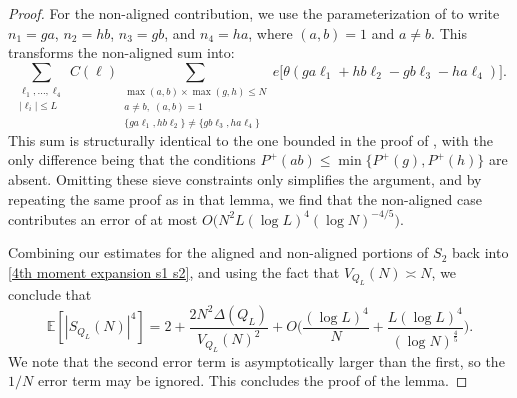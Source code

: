 \documentclass[12pt]{amsart}
\renewcommand{\leq}{\leqslant}
\numberwithin{equation}{section}
\theoremstyle{plain}
\theoremstyle{definition}
\renewcommand{\l}{\ell}
\newcommand{\E}{\mathbb{E}}
\begin{document}
\begin{proof}
		For the non-aligned contribution, we use the parameterization of  to write $n_1 = ga$, $n_2 = hb$, $n_3 = gb$, and $n_4 = ha$, where $(a,b)=1$ and $a \ne b$. This transforms the non-aligned sum into:
		\begin{equation}\label{eq: non-aligned T3 sum}
			\sum_{\substack{\l_1,\dots,\l_4 \\ |\l_i| \leq L}} C(\bm{\l}) \sum_{\substack{\max(a,b) \times \max(g,h) \leq N \\ a \ne b, \; (a,b) = 1 \\ \{ga\l_1,hb\l_2\} \ne \{gb\l_3,ha\l_4\}}} e\big[\theta (ga\l_1+hb\l_2-gb\l_3-ha\l_4)\big].
		\end{equation}
		This sum is structurally identical to the one bounded in the proof of , with the only difference being that the conditions $P^+(ab) \leq \min\{P^+(g),P^+(h)\}$ are absent. Omitting these sieve constraints only simplifies the argument, and by repeating the same proof as in that lemma, we find that the non-aligned case contributes an error of at most $O\big(N^2 L(\log L)^4 (\log N)^{-4/5}\big)$.
		
		Combining our estimates for the aligned and non-aligned portions of $S_2$ back into \eqref{4th moment expansion s1 s2}, and using the fact that $V_{Q_L}(N) \asymp N$, we conclude that
		$$\E[|S_{Q_L}(N)|^4] = 2+\frac{2 N^2 \Delta(Q_L)}{V_{Q_L}(N)^2} + O\bigg(\frac{(\log L)^4}{N} + \frac{ L (\log L)^4}{(\log N)^{\frac{4}{5}}}  \bigg).$$
		We note that the second error term is asymptotically larger than the first, so the $1/N$ error term may be ignored. This concludes the proof of the lemma.
	\end{proof}
	
\end{document}

